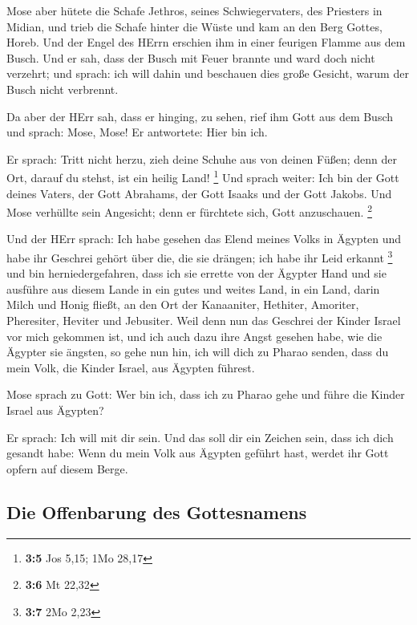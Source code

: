  Mose aber hütete die Schafe Jethros, seines
Schwiegervaters, des Priesters in Midian, und trieb die Schafe hinter
die Wüste und kam an den Berg Gottes, Horeb.  Und der
Engel des HErrn erschien ihm in einer feurigen Flamme aus dem Busch. Und
er sah, dass der Busch mit Feuer brannte und ward doch nicht verzehrt;
 und sprach: ich will dahin und beschauen dies große
Gesicht, warum der Busch nicht verbrennt.

 Da aber der HErr sah, dass er hinging, zu sehen, rief ihm
Gott aus dem Busch und sprach: Mose, Mose! Er antwortete: Hier bin ich.

 Er sprach: Tritt nicht herzu, zieh deine Schuhe aus von
deinen Füßen; denn der Ort, darauf du stehst, ist ein heilig Land!
\footnote{\textbf{3:5} Jos 5,15; 1Mo 28,17}  Und sprach
weiter: Ich bin der Gott deines Vaters, der Gott Abrahams, der Gott
Isaaks und der Gott Jakobs. Und Mose verhüllte sein Angesicht; denn er
fürchtete sich, Gott anzuschauen. \footnote{\textbf{3:6} Mt 22,32}

 Und der HErr sprach: Ich habe gesehen das Elend meines
Volks in Ägypten und habe ihr Geschrei gehört über die, die sie drängen;
ich habe ihr Leid erkannt \footnote{\textbf{3:7} 2Mo 2,23}
 und bin herniedergefahren, dass ich sie errette von der
Ägypter Hand und sie ausführe aus diesem Lande in ein gutes und weites
Land, in ein Land, darin Milch und Honig fließt, an den Ort der
Kanaaniter, Hethiter, Amoriter, Pheresiter, Heviter und Jebusiter.
 Weil denn nun das Geschrei der Kinder Israel vor mich
gekommen ist, und ich auch dazu ihre Angst gesehen habe, wie die Ägypter
sie ängsten,  so gehe nun hin, ich will dich zu Pharao
senden, dass du mein Volk, die Kinder Israel, aus Ägypten führest.

 Mose sprach zu Gott: Wer bin ich, dass ich zu Pharao
gehe und führe die Kinder Israel aus Ägypten?

 Er sprach: Ich will mit dir sein. Und das soll dir ein
Zeichen sein, dass ich dich gesandt habe: Wenn du mein Volk aus Ägypten
geführt hast, werdet ihr Gott opfern auf diesem Berge.

\hypertarget{die-offenbarung-des-gottesnamens}{%
\subsection{Die Offenbarung des
Gottesnamens}\label{die-offenbarung-des-gottesnamens}}

